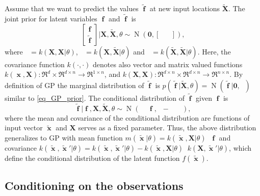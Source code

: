 \documentclass[twoside,11pt]{article}
\DeclareMathOperator{\Kff}{\mathbf{K}_{f,f}}
\DeclareMathOperator{\iKff}{\mathbf{K}_{f,f}^{-1}}
\DeclareMathOperator{\Kfa}{\mathbf{K}_{f,\tilde{f}}}
\DeclareMathOperator{\Kaf}{\mathbf{K}_{\tilde{f},f}}
\DeclareMathOperator{\Kaa}{\mathbf{K}_{\tilde{f},\tilde{f}}}
\DeclareMathOperator{\x}{\mathbf{x}}
\DeclareMathOperator{\f}{\mathbf{f}}
\DeclareMathOperator{\N}{N}
\newcommand{\mb}{\mathbf}
\begin{document}
Assume that we want to predict the values $\tilde{\f}$ at new input
locations $\tilde{\mb{X}}$. The joint prior for latent variables $\f$
and $\tilde{\f}$ is
%
\begin{equation}
\left[ \begin{matrix} \f \\ \tilde{\f} \end{matrix} \right] | \mb{X},
\tilde{\mb{X}},\theta
\sim \N\left(\mb{0}, \left[ \begin{matrix} \Kff & \Kfa \\ \Kaf & \Kaa
    \end{matrix} \right] \right),
\end{equation}
%
where $\Kff = k(\mb{X},\mb{X}|\theta)$, $\Kfa =
k(\mb{X},\tilde{\mb{X}}|\theta)$ and $\Kaa =
k(\tilde{\mb{X}},\tilde{\mb{X}}|\theta)$. Here, the covariance
function $k(\cdot,\cdot)$ denotes also vector and matrix valued
functions $k(\x,\mb{X}):\Re^d \times \Re^{d \times n}\rightarrow
\Re^{1\times n}$, and $k(\mb{X},\mb{X}):\Re^{d\times n}\times
\Re^{d\times n}\rightarrow \Re^{n\times n}$. By definition of GP the
marginal distribution of $\tilde{\f}$ is
$p(\tilde{\f}|\tilde{\mb{X}},\theta) = \N(\tilde{\f}|\mb{0}, \Kaa)$
similar to \eqref{eq_GP_prior}.  The conditional distribution of
$\tilde{\f}$ given $\f$ is
%
\begin{equation}\label{eq_conditional_ftilde_given_f}
\tilde{\f}|\f, \mb{X},
\tilde{\mb{X}}, \theta \sim \N(\Kaf\iKff\f, \Kaa - \Kaf\iKff\Kfa),
\end{equation}
%
where the mean and covariance of the conditional distribution are
functions of input vector $\tilde{\x}$ and $\mb{X}$ serves as a fixed
parameter.  Thus, the above distribution generalizes to GP with mean
function $m(\tilde{\x}|\theta) = k(\tilde{\x},\mb{X}|\theta)\iKff\f$
and covariance $k(\tilde{\x}, \tilde{\x}'|\theta) = k(\tilde{\x},
\tilde{\x}'|\theta) - k(\tilde{\x},\mb{X}|\theta)\iKff
k(\mb{X},\tilde{\x}'|\theta)$, which define the conditional
distribution of the latent function $f(\tilde{\x})$.

\subsection{Conditioning on the observations}
\end{document}
